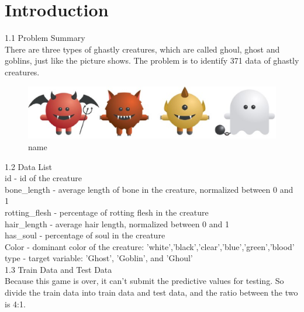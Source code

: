 
\section{Introduction}\label{sec-intro}

1.1 Problem Summary\\
\hspace*{0.4cm}There are three types of ghastly creatures, which are called ghoul, ghost and goblins, just like the picture shows. The problem is to identify 371 data of ghastly creatures. \\
\begin{figure}[htbp]\centering
	\includegraphics[scale=0.3]{1.eps}
	\caption{name}
\end{figure}


1.2 Data List\\
\hspace*{0.4cm}id - id of the creature\\
\hspace*{0.4cm}bone_length - average length of bone in the creature, normalized between 0 and 1\\
\hspace*{0.4cm}rotting_flesh - percentage of rotting flesh in the creature\\
\hspace*{0.4cm}hair_length - average hair length, normalized between 0 and 1\\
\hspace*{0.4cm}has_soul - percentage of soul in the creature\\
\hspace*{0.4cm}Color - dominant color of the creature: 'white','black','clear','blue','green','blood'\\
\hspace*{0.4cm}type - target variable: 'Ghost', 'Goblin', and 'Ghoul'\\
\hspace*{0.4cm}1.3 Train Data and Test Data\\
\hspace*{0.4cm}Because this game is over, it can't submit the predictive values for testing. So divide the train data into train data and test data, and the ratio between the two is 4:1.\\

